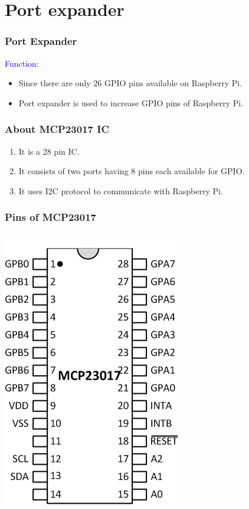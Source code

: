 \documentclass[10pt,red]{beamer}
\title
[
	Raspberry Pi Hardware Development	%
	\hspace{0.5cm}
	\insertframenumber/\inserttotalframenumber
]
{
	Interfacing Port Expander MCP23017 IC
}
\author
[
	www.e-yantra.org
]
{
	e-Yantra Team \\
  Embedded Real-Time Systems Lab\\
  Indian Institute of Technology-Bombay \\
}
\date
{
IIT Bombay \\ {\today}
}
\begin{document}
 

\begin{frame}
	\titlepage
\end{frame}
\section{Port expander}
\begin{frame}
	\frametitle{Port Expander} \pause
	\textcolor{blue}{Function:} \pause
	 \pause
	\begin{itemize}
		\item<+-|alert@+> Since there are only 26 GPIO pins available on Raspberry Pi.
		\item<+-|alert@+> Port expander is used to increase GPIO pins of Raspberry Pi.
	\end{itemize}
\end{frame}
\begin{frame}
	\frametitle{About MCP23017 IC} \pause
	\begin{enumerate}
		\item<+-|alert@+> It is a 28 pin IC.
		\item<+-|alert@+> It consists of two ports having 8 pins each available for GPIO.
		\item<+-|alert@+> It uses I2C protocol to communicate with Raspberry Pi.
		
	\end{enumerate}
	
\end{frame}
\begin{frame}
	\frametitle{Pins of MCP23017} \pause
	\centering
	\includegraphics[scale = 0.6]{mcp23017}
\end{frame}
\end{document}
